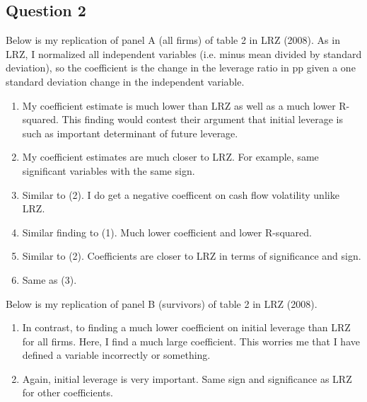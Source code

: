 \documentclass{article}
\begin{document}
\begin{landscape}
\section{Question 2}

Below is my replication of panel A (all firms) of table 2 in LRZ (2008). As in LRZ, I normalized all independent variables (i.e. minus mean divided by standard deviation), so the coefficient is the change in the leverage ratio in pp given a one standard deviation change in the independent variable.

\begin{enumerate}

\item My coefficient estimate is much lower than LRZ as well as a much lower R-squared. This finding would contest their argument that initial leverage is such as important determinant of future leverage.

\item My coefficient estimates are much closer to LRZ. For example, same significant variables with the same sign.

\item Similar to (2). I do get a negative coefficent on cash flow volatility unlike LRZ.

\item Similar finding to (1). Much lower coefficient and lower R-squared.

\item Similar to (2). Coefficients are closer to LRZ in terms of significance and sign.

\item Same as (3).

\end{enumerate}

\bigskip



Below is my replication of panel B (survivors) of table 2 in LRZ (2008).

\begin{enumerate}

\item In contrast, to finding a much lower coefficient on initial leverage than LRZ for all firms. Here, I find a much large coefficient.  This worries me that I have defined a variable incorrectly or something.

\item Again, initial leverage is very important.  Same sign and significance as LRZ for other coefficients.


\end{enumerate}
\end{landscape}
\end{document}
